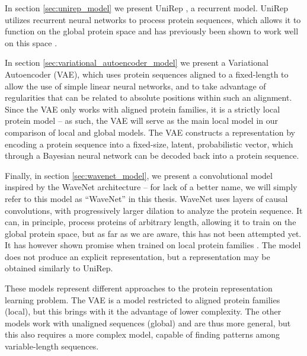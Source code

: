 In section \ref{sec:unirep_model} we present UniRep \cite{alley2019unified}, a recurrent model. UniRep utilizes recurrent neural networks to process protein sequences, which allows it to function on the global protein space and has previously been shown to work well on this space \cite{alley2019unified}. %

In section \ref{sec:variational_autoencoder_model} we present a Variational Autoencoder (VAE), which uses protein sequences aligned to a fixed-length to allow the use of simple linear neural networks, and to take advantage of regularities that can be related to absolute positions within such an alignment. Since the VAE only works with aligned protein families, it is a strictly local protein model -- as such, the VAE will serve as the main local model in our comparison of local and global models. The VAE constructs a representation by encoding a protein sequence into a fixed-size, latent, probabilistic vector, which through a Bayesian neural network can be decoded back into a protein sequence.

Finally, in section \ref{sec:wavenet_model}, we present a convolutional model inspired by the WaveNet \cite{oord2016wavenet} architecture -- for lack of a better name, we will simply refer to this model as ``WaveNet'' in this thesis. WaveNet uses layers of causal convolutions, with progressively larger dilation to analyze the protein sequence. It can, in principle, process proteins of arbitrary length, allowing it to train on the global protein space, but as far as we are aware, this has not been attempted yet. It has however shown promise when trained on local protein families \cite{riesselman2019accelerating}. The model does not produce an explicit representation, but a representation may be obtained similarly to UniRep.


These models represent different approaches to the protein representation learning problem. The VAE is a model restricted to aligned protein families (local), but this brings with it the advantage of lower complexity. The other models work with unaligned sequences (global) and are thus more general, but this also requires a more complex model, capable of finding patterns among variable-length sequences.


